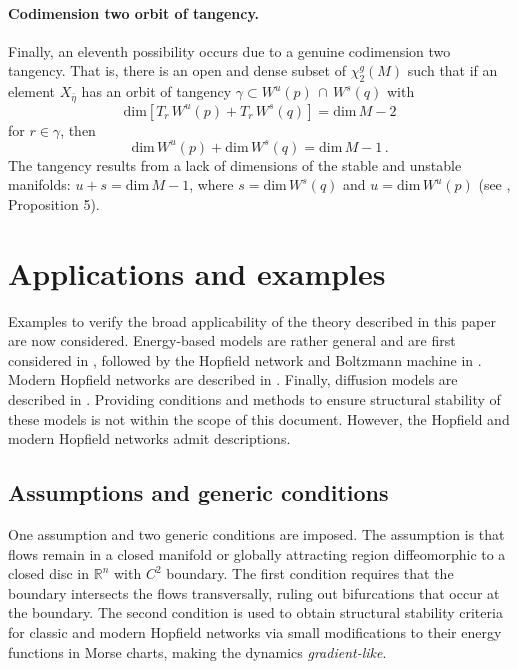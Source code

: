 \documentclass[12pt]{article}
\begin{document}

\paragraph{Codimension two orbit of tangency.}
Finally, an eleventh possibility occurs due to a genuine codimension two tangency. That is, there is an open and dense subset of $\chi_2^g(M)$ such that if an element $X_{\overline{\eta}}$ has an orbit of tangency $\gamma \subset W^u(p) \, \cap \, W^s(q)$ with 
\begin{equation*}
    \text{dim} \left[T_r \,W^u(p) +  T_r \, W^s(q) \right] = \text{dim} \, M - 2
\end{equation*}
for $r \in \gamma$, then 
\begin{equation*}
    \text{dim}\, W^u(p) + \text{dim}\, W^s(q)  = \text{dim} \, M - 1 \, .
\end{equation*}
The tangency results from a lack of dimensions of the stable and unstable manifolds: ${u+s = \text{dim} \, M-1}$, where $s = \text{dim} \, W^s(q)$ and $u = \text{dim} \, W^u(p)$ (see \cite{dias1989bifurcations}, Proposition 5).


\section{Applications and examples}
\label{section:applications-examples}
Examples to verify the broad applicability of the theory described in this paper are now considered. Energy-based models are rather general and are first considered in , followed by the Hopfield network and Boltzmann machine in . Modern Hopfield networks are described in . Finally, diffusion models are described in . Providing conditions and methods to ensure structural stability of these models is not within the scope of this document. However, the Hopfield and modern Hopfield networks admit descriptions. 


\subsection{Assumptions and generic conditions}
\label{section:assumptions}
One assumption and two generic conditions are imposed. The assumption is that flows remain in a closed manifold or globally attracting region diffeomorphic to a closed disc in $\mathbb{R}^n$ with $C^2$ boundary. The first condition requires that the boundary intersects the flows transversally, ruling out bifurcations that occur at the boundary. The second condition is used to obtain structural stability criteria for classic and modern Hopfield networks via small modifications to their energy functions in Morse charts, making the dynamics \textit{gradient-like}.
\end{document}
